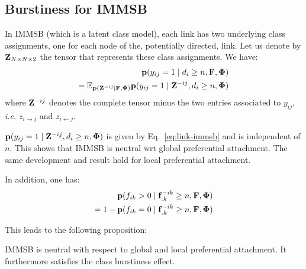 \subsection{Burstiness for IMMSB}
\label{subsec:burst-immsb}

In IMMSB (which is a latent class model), each link has two underlying class assignments, one for each node of the, potentially directed, link. Let us denote by $\mathbf{Z}_{N\times N\times 2}$ the tensor that represents these class assignments. We have:
%
\begin{align}
\mathbf{p}(y_{ij}=1 \mid d_i \ge n, \mathbf{F}, \mathbf{\Phi}) \nonumber \\
= \mathbb{E}_{\mathbf{p}(\mathbf{Z}^{-ij}|\mathbf{F}, \mathbf{\Phi})} \mathbf{p}(y_{ij}=1 \mid \mathbf{Z}^{-ij}, d_i \ge n, \mathbf{\Phi}) \nonumber
\end{align}
%
where $\mathbf{Z}^{-ij}$ denotes the complete tensor minus the two entries associated to $y_{ij}$, \textit{i.e.} $z_{i \rightarrow j}$ and $z_{i \leftarrow j}$.

$\mathbf{p}(y_{ij}=1 \mid \mathbf{Z}^{-ij}, d_i \ge n, \mathbf{\Phi})$ is given by Eq.~\ref{eq:link-immsb} and is independent of $n$. This shows that IMMSB is neutral wrt global preferential attachment. The same development and result hold for local preferential attachment.

In addition, one has:
%
\begin{align}
\mathbf{p}(f_{ik} > 0 \mid \mathbf{f}_{\bm{.}k}^{-ik} \ge n, \mathbf{F}, \mathbf{\Phi}) \nonumber \\
= 1 - \mathbf{p}(f_{ik} = 0 \mid \mathbf{f}_{\bm{.}k}^{-ik} \ge n, \mathbf{F}, \mathbf{\Phi}) \nonumber
\end{align}
%

This leads to the following proposition:
%
\begin{proposition}
IMMSB is neutral with respect to global and local preferential attachment. It furthermore satisfies the class burstiness effect.
\end{proposition}
%
